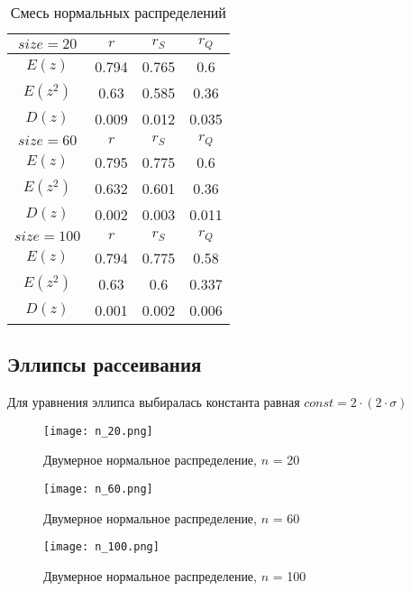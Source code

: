 \documentclass{article}
\begin{document}
	
	\begin{table}[H]
		\centering
		\begin{tabular}{| c | c | c | c |}
			
			\hline
			$size = 20$ & $r$      & $r_{S}$ & $r_{Q}$ \\
			\hline
			$E(z)$       & 0.794 & 0.765 & 0.6   \\
            $E(z^{2})$     & 0.63  & 0.585 & 0.36  \\
            $D(z)$     & 0.009 & 0.012 & 0.035 \\
			\hline
			$size = 60$ & $r$      & $r_{S}$ & $r_{Q}$ \\
			\hline
			$E(z)$     & 0.795 & 0.775 & 0.6   \\
            $E(z^{2})$  & 0.632 & 0.601 & 0.36  \\
            $D(z)$       & 0.002 & 0.003 & 0.011 \\
			\hline
			$size = 100$ & $r$      & $r_{S}$ & $r_{Q}$ \\
			\hline
			$E(z)$         & 0.794 & 0.775 & 0.58  \\
            $E(z^{2})$    & 0.63  & 0.6   & 0.337 \\
            $D(z)$      & 0.001 & 0.002 & 0.006 \\
			\hline
			
		\end{tabular}{}
		\caption{Смесь нормальных распределений}
		\label{tab:mix_normal}
	\end{table}
	
\subsection{Эллипсы рассеивания}
\noindent Для уравнения эллипса выбиралась константа равная $const = 2 \cdot (2 \cdot \sigma)$
	
	\begin{figure}[H]
		\centering
		\texttt{[image: n\_20.png]}
		\caption{Двумерное нормальное распределение, $n$ = 20}
		\label{fig:n20}
	\end{figure}
	
	\begin{figure}[H]
		\centering
		\texttt{[image: n\_60.png]}
		\caption{Двумерное нормальное распределение, $n$ = 60}
		\label{fig:n60}
	\end{figure}

	\begin{figure}[H]
		\centering
		\texttt{[image: n\_100.png]}
		\caption{Двумерное нормальное распределение, $n$ = 100}
		\label{fig:n100}
	\end{figure}
\end{document}
